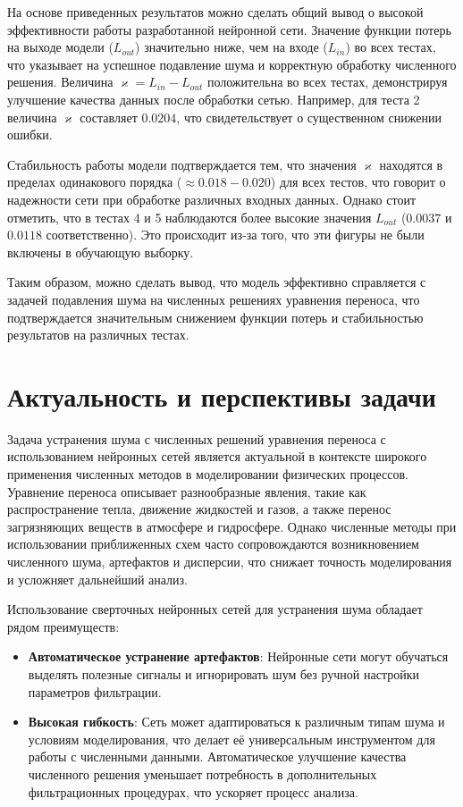 \documentclass[12pt, a4paper]{article}
\renewcommand{\kappa}{\varkappa}
\begin{document}
На основе приведенных результатов можно сделать общий вывод о высокой эффективности работы разработанной нейронной сети. Значение функции потерь на выходе модели ($L_{out}$) значительно ниже, чем на входе ($L_{in}$) во всех тестах, что указывает на успешное подавление шума и корректную обработку численного решения. Величина $\kappa = L_{in} - L_{out}$ положительна во всех тестах, демонстрируя улучшение качества данных после обработки сетью. Например, для теста 2 величина $\kappa$ составляет $0.0204$, что свидетельствует о существенном снижении ошибки. 

Стабильность работы модели подтверждается тем, что значения $\kappa$ находятся в пределах одинакового порядка ($\approx 0.018 - 0.020$) для всех тестов, что говорит о надежности сети при обработке различных входных данных. Однако стоит отметить, что в тестах 4 и 5 наблюдаются более высокие значения $L_{out}$ ($0.0037$ и $0.0118$ соответственно). Это происходит из-за того, что эти фигуры не были включены в обучающую выборку. 

Таким образом, можно сделать вывод, что модель эффективно справляется с задачей подавления шума на численных решениях уравнения переноса, что подтверждается значительным снижением функции потерь и стабильностью результатов на различных тестах.

\section{Актуальность и перспективы задачи}
Задача устранения шума с численных решений уравнения переноса с использованием нейронных сетей является актуальной в контексте широкого применения численных методов в моделировании физических процессов. Уравнение переноса описывает разнообразные явления, такие как распространение тепла, движение жидкостей и газов, а также перенос загрязняющих веществ в атмосфере и гидросфере. Однако численные методы при использовании приближенных схем часто сопровождаются возникновением численного шума, артефактов и дисперсии, что снижает точность моделирования и усложняет дальнейший анализ.

Использование сверточных нейронных сетей для устранения шума обладает рядом преимуществ:
\begin{itemize}
	\item \textbf{Автоматическое устранение артефактов}: Нейронные сети могут обучаться выделять полезные сигналы и игнорировать шум без ручной настройки параметров фильтрации. 
	\item \textbf{Высокая гибкость}: Сеть может адаптироваться к различным типам шума и условиям моделирования, что делает её универсальным инструментом для работы с численными данными. Автоматическое улучшение качества численного решения уменьшает потребность в дополнительных фильтрационных процедурах, что ускоряет процесс анализа. 
\end{itemize}
\end{document}
